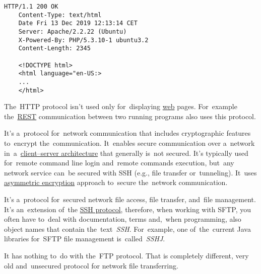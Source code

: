 \begin{lstlisting}[title={Example of a~HTTP response}]
    HTTP/1.1 200 OK
    Content-Type: text/html
    Date Fri 13 Dec 2019 12:13:14 CET
    Server: Apache/2.2.22 (Ubuntu)
    X-Powered-By: PHP/5.3.10-1 ubuntu3.2
    Content-Length: 2345

    <!DOCTYPE html>
    <html language="en-US:>
    ...
    </html>
\end{lstlisting}

\notenonl The~HTTP protocol isn't used only for~displaying \hyperref[internetweb]{web} pages.
For~example the~\hyperref[rest]{REST} communication between two running programs also uses this protocol.

\label{smtp}

\label{ssh}
It's a~protocol for~network communication that includes cryptographic features to~encrypt the~communication.
It~enables secure communication over a~network in~a~\hyperref[clientserverarchitecture]{client--server architecture} that generally is~not secured.
It's typically used for~remote command line login and~remote commands execution, but~any network service can~be secured with SSH (e.g., file transfer or~tunneling).
It~uses \hyperref[asymmetricencryption]{asymmetric encryption} approach to~secure the~network communication.

\label{sftp}
It's a~protocol for~secured network file access, file transfer, and~file management.
It's an~extension of~the \hyperref[ssh]{SSH protocol}, therefore, when working with SFTP, you often have to~deal with documentation, terms and,~when programming, also object names that contain the~text~\textit{SSH}.
For~example, one of~the~current Java libraries for~SFTP file management is~called~\textit{SSHJ}.

\warning It has nothing to~do with the~FTP protocol.
That is completely different, very old and~unsecured protocol for network file transferring.

